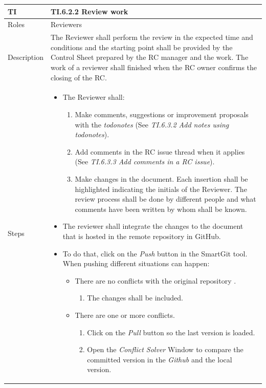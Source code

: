 \documentclass{template/openetcs_article}
\begin{document}
\begin{flushleft}
\tablefirsthead{}
\tablehead{}
\tabletail{}
\tablelasttail{}
\begin{supertabular}{|m{2cm}|m{13cm}|}
\hline
{}
TI & 
TI.6.2.2 Review work
\\\hline
Roles &
Reviewers
\\\hline
Description &
The Reviewer shall perform the review in the expected time and conditions and the starting point shall be provided by the Control Sheet prepared by the RC manager and the work. The work of a reviewer shall finished when the RC owner confirms the closing of the RC.
\\\hline
Steps &
\begin{itemize}
\item The Reviewer shall:
\begin{enumerate}
\item Make comments, suggestions or improvement proposals with the {\it todonotes} (See {\it TI.6.3.2 Add notes using todonotes}).
\item Add comments in the RC issue thread when it applies (See {\it TI.6.3.3 Add comments in a RC issue}).
\item Make changes in the document. Each insertion shall be highlighted indicating the initials of the Reviewer. The review process shall be done by different people and what comments have been written by whom shall be known.
\end{enumerate}
\item The reviewer shall integrate the changes to the document that is hosted in the remote repository in GitHub. 
\item To do that, click on the {\it Push} button in the SmartGit tool. When pushing different situations can happen:
\begin{itemize}
\item There are no conflicts with the original repository .
\begin{enumerate}
\item The changes shall be included.
\end{enumerate}
\end{itemize}
\begin{itemize}
\item There are one or more conflicts.
\begin{enumerate}
\item Click on the {\it Pull} button so the last version is loaded. 
\item Open the {\it Conflict Solver} Window to compare the committed version in the {\it Github} and the local version. 

\end{enumerate}
\end{itemize}
\end{itemize}
\end{supertabular}
\end{flushleft}
\end{document}
